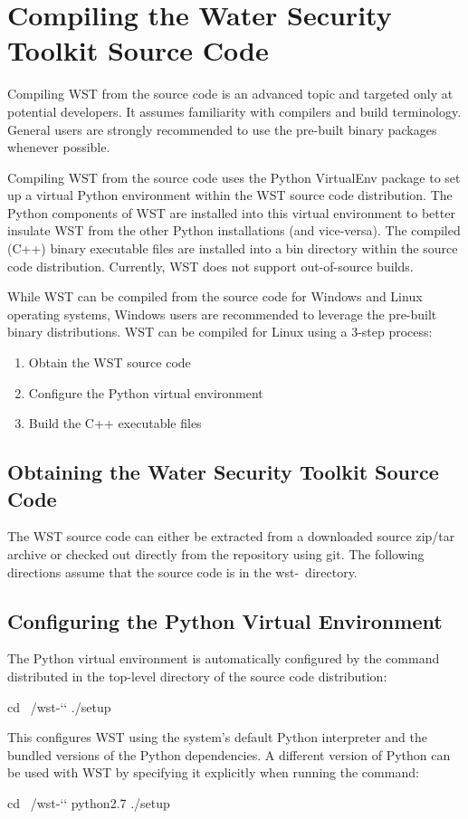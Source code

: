 \section{Compiling the Water Security Toolkit Source Code}

Compiling WST from the source code is an advanced topic and targeted
only at potential developers. It assumes familiarity with compilers and
build terminology. General users are strongly recommended to use the 
pre-built binary packages whenever possible.  

Compiling WST from the source code uses the Python VirtualEnv package to
set up a virtual Python environment within the WST source code
distribution. The Python components of WST are installed into this
virtual environment to better insulate WST from the other Python installations 
(and vice-versa). The compiled (C++) binary
executable files are installed into a bin directory within the
source code distribution. Currently, WST does not support out-of-source builds.

While WST can be compiled from the source code for Windows and Linux 
operating systems, Windows users are recommended 
to leverage the pre-built binary distributions. WST can be compiled for Linux 
using a 3-step process:
\begin{enumerate}
\item Obtain the WST source code
\item Configure the Python virtual environment
\item Build the C++ executable files
\end{enumerate}

\subsection{Obtaining the Water Security Toolkit Source Code}
The WST source code can either be extracted from a downloaded source zip/tar
archive or checked out directly from the repository using git.
The following directions assume that the source code is in the
wst-\wstversion~directory.

\subsection{Configuring the Python Virtual Environment}
The Python virtual environment is automatically configured by the
 command distributed in the top-level directory of the
source code distribution:
\begin{unknownListing}
cd ~/wst-`\wstversion`
./setup
\end{unknownListing}
This configures WST using the system's default Python interpreter and
the bundled versions of the Python dependencies. A different version of Python 
can be used with WST by specifying it explicitly when running
the  command:
\begin{unknownListing}
cd ~/wst-`\wstversion`
python2.7 ./setup
\end{unknownListing}

